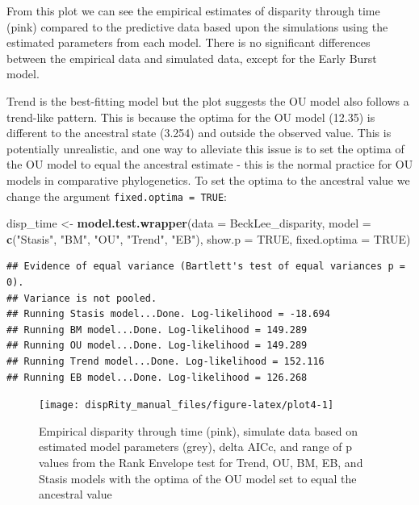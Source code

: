\documentclass[
]{book}
\newenvironment{Shaded}{\begin{snugshade}}{\end{snugshade}}
\newcommand{\DataTypeTok}[1]{\textcolor[rgb]{0.13,0.29,0.53}{#1}}
\newcommand{\KeywordTok}[1]{\textcolor[rgb]{0.13,0.29,0.53}{\textbf{#1}}}
\newcommand{\NormalTok}[1]{#1}
\newcommand{\OtherTok}[1]{\textcolor[rgb]{0.56,0.35,0.01}{#1}}
\newcommand{\StringTok}[1]{\textcolor[rgb]{0.31,0.60,0.02}{#1}}
\begin{document}
From this plot we can see the empirical estimates of disparity through time (pink) compared to the predictive data based upon the simulations using the estimated parameters from each model.
There is no significant differences between the empirical data and simulated data, except for the Early Burst model.

Trend is the best-fitting model but the plot suggests the OU model also follows a trend-like pattern.
This is because the optima for the OU model (12.35) is different to the ancestral state (3.254) and outside the observed value.
This is potentially unrealistic, and one way to alleviate this issue is to set the optima of the OU model to equal the ancestral estimate - this is the normal practice for OU models in comparative phylogenetics.
To set the optima to the ancestral value we change the argument \texttt{fixed.optima\ =\ TRUE}:

\begin{Shaded}
\begin{Highlighting}[]
\NormalTok{disp\_time \textless{}{-}}\StringTok{ }\KeywordTok{model.test.wrapper}\NormalTok{(}\DataTypeTok{data =}\NormalTok{ BeckLee\_disparity,}
                    \DataTypeTok{model =} \KeywordTok{c}\NormalTok{(}\StringTok{"Stasis"}\NormalTok{, }\StringTok{"BM"}\NormalTok{, }\StringTok{"OU"}\NormalTok{, }\StringTok{"Trend"}\NormalTok{, }\StringTok{"EB"}\NormalTok{),}
                                \DataTypeTok{show.p =} \OtherTok{TRUE}\NormalTok{, }\DataTypeTok{fixed.optima =} \OtherTok{TRUE}\NormalTok{)}
\end{Highlighting}
\end{Shaded}

\begin{verbatim}
## Evidence of equal variance (Bartlett's test of equal variances p = 0).
## Variance is not pooled.
## Running Stasis model...Done. Log-likelihood = -18.694
## Running BM model...Done. Log-likelihood = 149.289
## Running OU model...Done. Log-likelihood = 149.289
## Running Trend model...Done. Log-likelihood = 152.116
## Running EB model...Done. Log-likelihood = 126.268
\end{verbatim}

\begin{figure}

{\centering \texttt{[image: dispRity\_manual\_files/figure-latex/plot4-1]} 

}

\caption{Empirical disparity through time (pink), simulate data based on estimated model parameters (grey), delta AICc, and range of p values from the Rank Envelope test for Trend, OU, BM, EB, and Stasis models with the optima of the OU model set to equal the ancestral value}\label{fig:plot4}
\end{figure}
\end{document}
